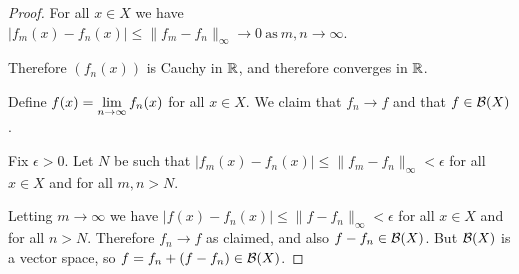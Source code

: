 \begin{enumerate}
\begin{proof}
    For all $x \in X$ we have
    $|f_m(x) - f_n(x)| \leq \|f_m - f_n\|_\infty \to 0 ~\text{as}~ m, n \to \infty$.

    Therefore $(f_n(x))$ is Cauchy in $\mathbb{R}$, and therefore converges in $\mathbb{R}$.

    Define $f(x) = \limn f_n(x)$ for all $x \in X$. We claim that $f_n \to f$ and that
    $f \in \mathcal B(X)$.

    Fix $\epsilon > 0$. Let $N$ be such that
    $|f_m(x) - f_n(x)| \leq \|f_m - f_n\|_\infty < \epsilon$ for all $x \in X$ and for all
    $m, n > N$.

    Letting $m \to \infty$ we have $|f(x) - f_n(x)| \leq \|f - f_n\|_\infty < \epsilon$ for all
    $x \in X$ and for all $n > N$. Therefore $f_n \to f$ as claimed, and also $f - f_n \in
    \mathcal B(X)$. But $\mathcal B(X)$ is a vector space, so $f = f_n + (f - f_n) \in \mathcal B(X)$.
  \end{proof}


\end{enumerate}

\newpage
